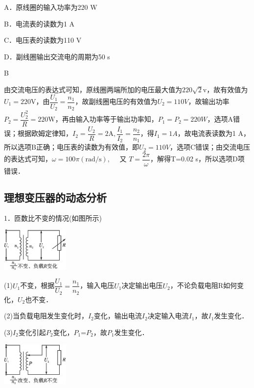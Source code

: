 \documentclass[cn,10.5pt,chinese,mac,chinesefont=founder]{elegantbook}
\begin{document}
A．原线圈的输入功率为220 W

B．电流表的读数为1 A

C．电压表的读数为110 V

D．副线圈输出交流电的周期为50 s
\begin{solution}
	B
	
	由交流电压的表达式可知，原线圈两端所加的电压最大值为$220 \sqrt{2} \mathrm{v}$，故有效值为$U_{1}=220 \mathrm{V}$，由$\dfrac{U_{1}}{U_{2}}=\dfrac{n_{1}}{n_{2}}$，故副线圈电压的有效值为$U_2=110V$，故输出功率$P_{2}=\dfrac{U_{2}^{2}}{R}=220 \mathrm{W}$，再由输入功率等于输出功率知，$P_1=P_2=220W$，选项A错误；根据欧姆定律知，$I_{2}=\dfrac{U_{2}}{R}=2 \mathrm{A}, \dfrac{I_{1}}{I_{2}}=\dfrac{n_{2}}{n_{1}}$，得$I_1=1 A$，故电流表读数为1
A，所以选项B正确；电压表的读数为有效值，即$U_2=110
V$，选项C错误；由交流电压的表达式可知，$\omega=100 \pi(\mathrm{rad} / \mathrm{s}), \quad$ 又 $T=\dfrac{2 \pi}{\omega}$，解得T=0.02
s，所以选项D项错误．
\end{solution}
\newpage
\subsection{理想变压器的动态分析}

1．匝数比不变的情况(如图所示)

\begin{center}\includegraphics[width=1.31111in,height=0.84931in]{media/image452.png}\end{center}

(1)$U_1$不变，根据$\dfrac{U_{1}}{U_{2}}=\dfrac{n_{1}}{n_{2}}$，输入电压$U_1$决定输出电压$U_2$，不论负载电阻R如何变化，$U_2$也不变．

(2)当负载电阻发生变化时，$I_2$变化，输出电流$I_2$决定输入电流$I_1$，故$I_1$发生变化．

(3)$I_2$变化引起$P_2$变化，$P_1$=$P_2$，故$P_1$发生变化．

\begin{center}\includegraphics[width=1.31111in,height=0.84931in]{media/image453.png}\end{center}
\end{document}
